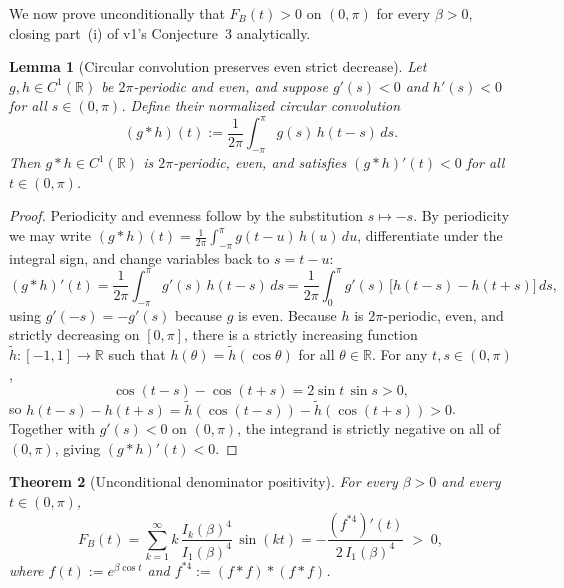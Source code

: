 \documentclass[11pt]{article}
\newtheorem{theorem}{Theorem}
\newtheorem{lemma}[theorem]{Lemma}
\theoremstyle{remark}
\begin{document}
We now prove unconditionally that $F_B(t) > 0$ on $(0,\pi)$ for every $\beta > 0$, closing
part~(i) of v1's Conjecture~3 analytically.

\begin{lemma}[Circular convolution preserves even strict decrease]
\label{lem:conv-dec}
Let $g, h \in C^1(\mathbb{R})$ be $2\pi$-periodic and even, and suppose $g'(s) < 0$ and
$h'(s) < 0$ for all $s \in (0,\pi)$. Define their normalized circular convolution
\[
(g * h)(t) := \frac{1}{2\pi}\int_{-\pi}^{\pi} g(s)\,h(t-s)\,ds.
\]
Then $g * h \in C^1(\mathbb{R})$ is $2\pi$-periodic, even, and satisfies
$(g * h)'(t) < 0$ for all $t \in (0,\pi)$.
\end{lemma}

\begin{proof}
Periodicity and evenness follow by the substitution $s \mapsto -s$. By periodicity we may
write $(g*h)(t) = \frac{1}{2\pi}\int_{-\pi}^{\pi} g(t-u)\,h(u)\,du$, differentiate under the
integral sign, and change variables back to $s = t-u$:
\[
(g*h)'(t) = \frac{1}{2\pi}\int_{-\pi}^{\pi} g'(s)\,h(t-s)\,ds
= \frac{1}{2\pi}\int_{0}^{\pi} g'(s)\,\bigl[h(t-s) - h(t+s)\bigr]\,ds,
\]
using $g'(-s) = -g'(s)$ because $g$ is even. Because $h$ is $2\pi$-periodic, even, and
strictly decreasing on $[0,\pi]$, there is a strictly increasing function
$\tilde{h} : [-1,1] \to \mathbb{R}$ such that $h(\theta) = \tilde{h}(\cos\theta)$ for all
$\theta \in \mathbb{R}$. For any $t, s \in (0,\pi)$,
\[
\cos(t-s) - \cos(t+s) = 2\sin t\,\sin s > 0,
\]
so $h(t-s) - h(t+s) = \tilde{h}(\cos(t-s)) - \tilde{h}(\cos(t+s)) > 0$. Together with
$g'(s) < 0$ on $(0,\pi)$, the integrand is strictly negative on all of $(0,\pi)$, giving
$(g*h)'(t) < 0$.
\end{proof}

\begin{theorem}[Unconditional denominator positivity]
\label{thm:denom-pos}
For every $\beta > 0$ and every $t \in (0,\pi)$,
\[
F_B(t) = \sum_{k=1}^\infty k\,\frac{I_k(\beta)^4}{I_1(\beta)^4}\,\sin(kt)
= -\frac{(f^{*4})'(t)}{2\,I_1(\beta)^4} \;>\; 0,
\]
where $f(t) := e^{\beta\cos t}$ and $f^{*4} := (f*f)*(f*f)$.
\end{theorem}
\end{document}
